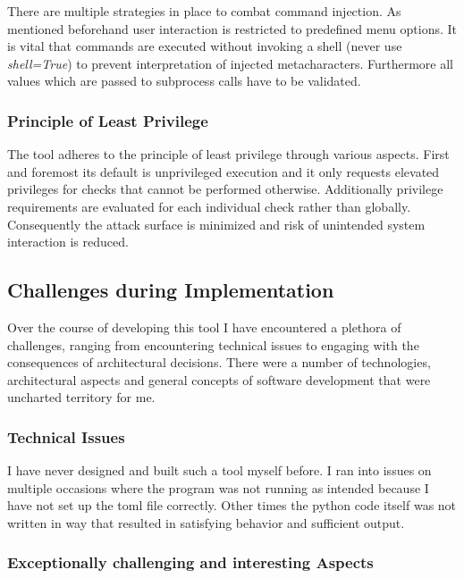 There are multiple strategies in place to combat command injection. As mentioned beforehand user interaction is restricted to predefined menu options. It is vital that commands are executed without invoking a shell (never use \textit{shell=True}) to prevent interpretation of injected metacharacters. Furthermore all values which are passed to subprocess calls have to be validated.

\subsubsection{Principle of Least Privilege}

The tool adheres to the principle of least privilege through various aspects. First and foremost its default is unprivileged execution and it only requests elevated privileges for checks that cannot be performed otherwise. Additionally privilege requirements are evaluated for each individual check rather than globally. Consequently the attack surface is minimized and risk of unintended system interaction is reduced.

\subsection{Challenges during Implementation}

Over the course of developing this tool I have encountered a plethora of challenges, ranging from encountering technical issues to engaging with the consequences of architectural decisions. There were a number of technologies, architectural aspects and general concepts of software development that were uncharted territory for me. 

\subsubsection{Technical Issues}

I have never designed and built such a tool myself before. I ran into issues on multiple occasions where the program was not running as intended because I have not set up the toml file correctly. Other times the python code itself was not written in way that resulted in satisfying behavior and sufficient output. 

\subsubsection{Exceptionally challenging and interesting Aspects}


